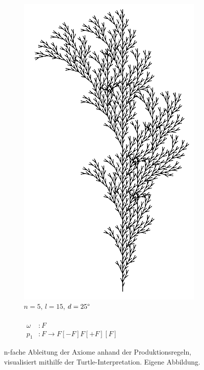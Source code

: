 \begin{figure} [hbtp]
\begin{subfigure}[t]{.4\textwidth}
		\includegraphics[width=\linewidth]{images/Branching2_N5L15D25.png}
		\caption{$n=5$, $l=15$, $d=25\degree$\\ \\
			$\begin{array}{ll}
				\omega & : F \\
				p_1 & : F \rightarrow F[-F]F[+F][F]
			\end{array}
			\label{eq:ProdBranching2}$\\
			\cite[S.78]{PCGiG:16}
		}
		\label{fig:Branching2L15D25}
	\end{subfigure}

	\caption{n-fache Ableitung der Axiome anhand der Produktionsregeln, visualisiert mithilfe der Turtle-Interpretation. Eigene Abbildung.}
	\label{fig:KochkurveAbleitung}
\end{figure}

